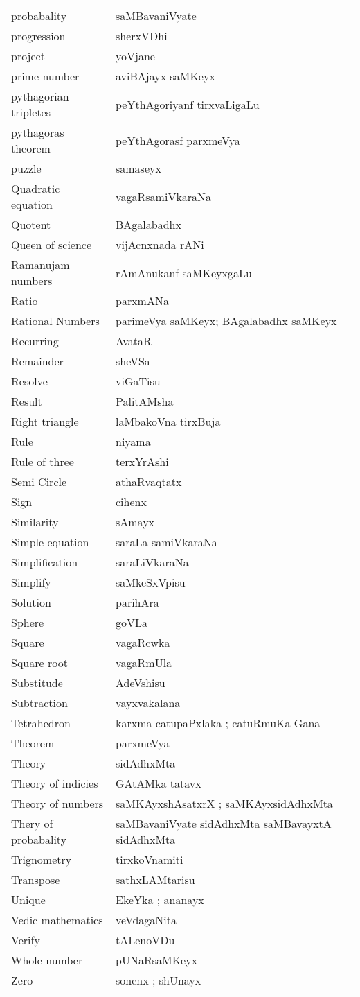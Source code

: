 \begin{longtable}{>{\rm}l@{\hspace{1cm}}l}
probabality & saMBavaniVyate\\
progression & sherxVDhi\\
project & yoVjane\\
prime number & aviBAjayx saMKeyx\\
pythagorian tripletes & peYthAgoriyanf tirxvaLigaLu\\
pythagoras theorem & peYthAgorasf parxmeVya\\
puzzle & samaseyx\\
Quadratic equation & vagaRsamiVkaraNa\\
Quotent & BAgalabadhx\\
Queen of science & vijAcnxnada rANi\\
Ramanujam numbers & rAmAnukanf saMKeyxgaLu\\
Ratio & parxmANa\\
Rational Numbers & parimeVya saMKeyx; BAgalabadhx saMKeyx\\
Recurring & AvataR\\
Remainder & sheVSa\\
Resolve & viGaTisu\\
Result & PalitAMsha\\
Right triangle & laMbakoVna tirxBuja\\
Rule & niyama\\
Rule of three & terxYrAshi\\
Semi Circle & athaRvaqtatx\\
Sign & cihenx\\
Similarity & sAmayx\\
Simple equation & saraLa samiVkaraNa\\
Simplification & saraLiVkaraNa\\
Simplify & saMkeSxVpisu\\
Solution & parihAra\\
Sphere & goVLa\\
Square & vagaRcwka\\
Square root & vagaRmUla\\
Substitude & AdeVshisu\\
Subtraction & vayxvakalana\\
Tetrahedron & karxma catupaPxlaka ; catuRmuKa Gana\\
Theorem & parxmeVya\\
Theory & sidAdhxMta\\
Theory of indicies & GAtAMka tatavx\\
Theory of numbers & saMKAyxshAsatxrX ; saMKAyxsidAdhxMta\\
Thery of probabality & saMBavaniVyate sidAdhxMta saMBavayxtA sidAdhxMta\\
Trignometry & tirxkoVnamiti\\
Transpose & sathxLAMtarisu\\
Unique & EkeYka ; ananayx\\
Vedic mathematics & veVdagaNita\\
Verify & tALenoVDu\\
Whole number & pUNaRsaMKeyx\\
Zero & sonenx ; shUnayx
\end{longtable}

